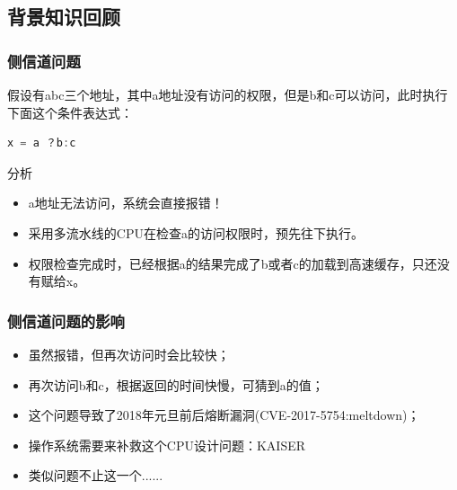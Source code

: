 \subsection{背景知识回顾} %
\begin{frame}[fragile]
    \frametitle{侧信道问题}
    \begin{block}{}
    假设有abc三个地址，其中a地址没有访问的权限，但是b和c可以访问，此时执行下面这个条件表达式：
    \begin{lstlisting}[language = C]
        x = a ？b:c
    \end{lstlisting}
    \end{block}
    \begin{block}{分析}
	    \begin{itemize}
	        \item a地址无法访问，系统会直接报错！
	        \item 采用多流水线的CPU在检查a的访问权限时，预先往下执行。
	        \item 权限检查完成时，已经根据a的结果完成了b或者c的加载到高速缓存，只还没有赋给x。
	    \end{itemize}
    \end{block}
\end{frame}
\begin{frame}[fragile]
    \frametitle{侧信道问题的影响}
	    \begin{itemize}
	        \item 虽然报错，但再次访问时会比较快；
	        \item 再次访问b和c，根据返回的时间快慢，可猜到a的值；
	        \item 这个问题导致了2018年元旦前后熔断漏洞(CVE-2017-5754:meltdown)；
	        \item 操作系统需要来补救这个CPU设计问题：KAISER
	        \item 类似问题不止这一个......
	    \end{itemize}
\end{frame}

